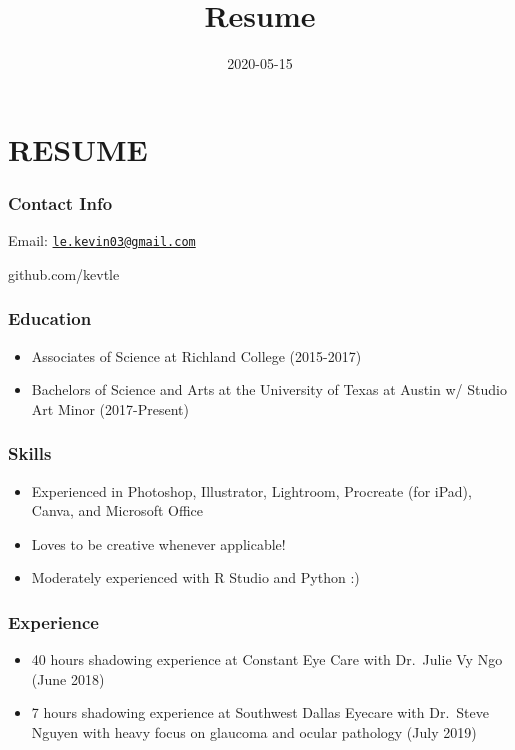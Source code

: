 \documentclass[]{article}
\title{Resume}
\author{}
\date{\vspace{-2.5em}2020-05-15}
\providecommand{\tightlist}{%
  \setlength{\itemsep}{0pt}\setlength{\parskip}{0pt}}
\begin{document}
\maketitle

\section{RESUME}\label{resume}

\subsubsection{Contact Info}\label{contact-info}

Email:
\href{mailto:le.kevin03@gmail.com}{\nolinkurl{le.kevin03@gmail.com}}

github.com/kevtle

\subsubsection{Education}\label{education}

\begin{itemize}
\tightlist
\item
  Associates of Science at Richland College (2015-2017)
\item
  Bachelors of Science and Arts at the University of Texas at Austin w/
  Studio Art Minor (2017-Present)
\end{itemize}

\subsubsection{Skills}\label{skills}

\begin{itemize}
\tightlist
\item
  Experienced in Photoshop, Illustrator, Lightroom, Procreate (for
  iPad), Canva, and Microsoft Office
\item
  Loves to be creative whenever applicable!
\item
  Moderately experienced with R Studio and Python :)
\end{itemize}

\subsubsection{Experience}\label{experience}

\begin{itemize}
\tightlist
\item
  40 hours shadowing experience at Constant Eye Care with Dr.~Julie Vy
  Ngo (June 2018)
\item
  7 hours shadowing experience at Southwest Dallas Eyecare with
  Dr.~Steve Nguyen with heavy focus on glaucoma and ocular pathology
  (July 2019)
\end{itemize}
\end{document}
